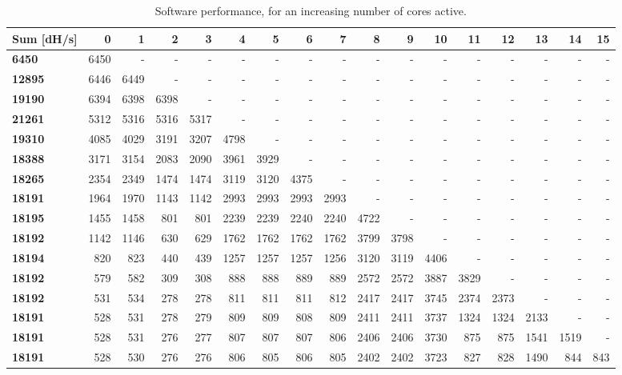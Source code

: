 \begin{appendix}
\begin{sidewaystable}
\centering
\begin{tabular}{| l || r r r r | r r r r | r r r | r r r r r |}
  \hline 
  \textbf{Sum} [dH/s] & \textbf{0} & \textbf{1} & \textbf{2} & \textbf{3} & \textbf{4} & \textbf{5} & \textbf{6} & \textbf{7} & \textbf{8} & \textbf{9} & \textbf{10} & \textbf{11} & \textbf{12} & \textbf{13} & \textbf{14} & \textbf{15}   \\
  \hline                       
  \textbf{6450} & 6450 & - & - & - & - & - & - & - & - & - & - & - & - & - & - & - \\
  \textbf{12895} & 6446 &6449 & - & - & - & - & - & - & - & - & - & - & - & - & - & - \\
  \textbf{19190} & 6394 & 6398 & 6398 & - & - & - & - & - & - & - & - & - & - & - & - & - \\
  \textbf{21261} & 5312 & 5316 & 5316 & 5317 & - & - & - & - & - & - & - & - & - & - & - & - \\
  \textbf{19310} & 4085 & 4029 & 3191 & 3207 & 4798 & - & - & - & - & - & - & - & - & - & - & - \\
  \textbf{18388} & 3171 & 3154 & 2083 & 2090 & 3961 & 3929 & - & - & - & - & - & - & - & - & - & - \\
  \textbf{18265} & 2354 & 2349 & 1474 & 1474 & 3119 & 3120 & 4375 & - & - & - & - & - & - & - & - & - \\
  \textbf{18191} & 1964 & 1970 & 1143 & 1142 & 2993 & 2993 & 2993 & 2993 & - & - & - & - & - & - & - & -\\
  \textbf{18195} & 1455 & 1458 & 801 & 801 & 2239 & 2239 & 2240 & 2240 & 4722 & - & - & - & - & - & - & -\\
  \textbf{18192} & 1142 & 1146 & 630 & 629 & 1762 & 1762 & 1762 & 1762 & 3799 & 3798 & - & - & - & - & - & -\\
  \textbf{18194} & 820 & 823 & 440 & 439 & 1257 & 1257 & 1257 & 1256 & 3120 & 3119 & 4406 & - & - & - & - & -\\
  \textbf{18192} & 579 & 582 & 309 & 308 & 888 & 888 & 889 & 889 & 2572 & 2572 & 3887 & 3829 & - & - & - & -\\
  \textbf{18192} & 531 & 534 & 278 & 278 & 811 & 811 & 811 & 812 & 2417 & 2417 & 3745 & 2374 & 2373 & - & - & -\\
  \textbf{18191} & 528 & 531 & 278 & 279 & 809 & 809 & 808 & 809 & 2411 & 2411 & 3737 & 1324 & 1324 & 2133 & - & -\\
  \textbf{18191} & 528 & 531 & 276 & 277 & 807 & 807 & 807 & 806 & 2406 & 2406 & 3730 & 875 & 875 & 1541 & 1519	 & -\\
  \textbf{18191} & 528 & 530 & 276 & 276 & 806 & 805 & 806 & 805 & 2402 & 2402 & 3723 & 827 & 828 & 1490 & 844 & 843\\
  \hline  
\end{tabular}
\caption{Software performance, for an increasing number of cores active.}
\label{tab:Full-Perf-SW1}
\end{sidewaystable}


\end{appendix}
